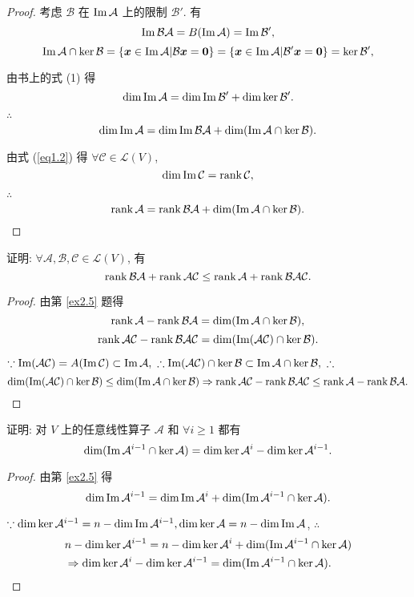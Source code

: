 \documentclass[color=black,device=normal,lang=cn,mode=geye]{elegantnote}
\begin{document}
\begin{proof}
    考虑 $\mathcal{B}$ 在 $\operatorname{Im} \mathcal{A}$ 上的限制 $\mathcal{B}'$. 有
    \[\operatorname{Im} \mathcal{BA}=B(\operatorname{Im} \mathcal{A})=\operatorname{Im} \mathcal{B}',\]
    \[\operatorname{Im} \mathcal{A}\cap\ker\mathcal{B}=\{\boldsymbol{x}\in\operatorname{Im} \mathcal{A}|\mathcal{B}\boldsymbol{x}=\boldsymbol{0}\}=\{\boldsymbol{x}\in\operatorname{Im} \mathcal{A}|\mathcal{B}'\boldsymbol{x}=\boldsymbol{0}\}=\ker\mathcal{B}',\]

    由书上的式 (1) 得
    \[\dim\operatorname{Im} \mathcal{A}=\dim\operatorname{Im} \mathcal{B}'+\dim\ker\mathcal{B}'.\]

    $\therefore$
    \[\dim\operatorname{Im} \mathcal{A}=\dim\operatorname{Im} \mathcal{BA}+\dim(\operatorname{Im} \mathcal{A}\cap\ker\mathcal{B}).\]

    由式 (\ref{eq1.2}) 得 $\forall\mathcal{C}\in\mathcal{L}(V)$,
    \[\dim\operatorname{Im} \mathcal{C}=\operatorname{rank} \mathcal{C},\]

    $\therefore$
    \[\operatorname{rank} \mathcal{A}=\operatorname{rank} \mathcal{BA}+\dim(\operatorname{Im} \mathcal{A}\cap\ker\mathcal{B}).\qedhere\]
\end{proof}
\begin{exercise}%
    证明: $\forall\mathcal{A},\mathcal{B},\mathcal{C}\in\mathcal{L}(V)$, 有
    \[\operatorname{rank} \mathcal{BA}+\operatorname{rank} \mathcal{AC}\leq\operatorname{rank} \mathcal{A}+\operatorname{rank} \mathcal{BAC}.\]
\end{exercise}
\begin{proof}
    由第 \ref{ex2.5} 题得
    \[\operatorname{rank} \mathcal{A}-\operatorname{rank} \mathcal{BA}=\dim(\operatorname{Im} \mathcal{A}\cap\ker\mathcal{B}),\]
    \[\operatorname{rank} \mathcal{AC}-\operatorname{rank} \mathcal{BAC}=\dim(\operatorname{Im} (\mathcal{AC})\cap\ker\mathcal{B}).\]

    $\because\operatorname{Im} (\mathcal{AC})=A(\operatorname{Im} \mathcal{C})\subset\operatorname{Im} \mathcal{A},\ \therefore\operatorname{Im} (\mathcal{AC})\cap\ker\mathcal{B}\subset\operatorname{Im} \mathcal{A}\cap\ker\mathcal{B},\ \therefore$
    \[\dim(\operatorname{Im} (\mathcal{AC})\cap\ker\mathcal{B})\leq\dim(\operatorname{Im} \mathcal{A}\cap\ker\mathcal{B})\Rightarrow\operatorname{rank} \mathcal{AC}-\operatorname{rank} \mathcal{BAC}\leq\operatorname{rank} \mathcal{A}-\operatorname{rank} \mathcal{BA}.\qedhere\]
\end{proof}
\begin{exercise}%
    证明: 对 $V$ 上的任意线性算子 $\mathcal{A}$ 和 $\forall i\geq1$ 都有
    \[\dim(\operatorname{Im}\mathcal{A}^{i-1}\cap\ker\mathcal{A})=\dim\ker\mathcal{A}^i-\dim\ker\mathcal{A}^{i-1}.\]
\end{exercise}
\begin{proof}
    由第 \ref{ex2.5} 得
    \[\dim\operatorname{Im}\mathcal{A}^{i-1}=\dim\operatorname{Im}\mathcal{A}^i+\dim(\operatorname{Im}\mathcal{A}^{i-1}\cap\ker\mathcal{A}).\]

    $\because\dim\ker\mathcal{A}^{i-1}=n-\dim\operatorname{Im}\mathcal{A}^{i-1},\dim\ker\mathcal{A}=n-\dim\operatorname{Im}\mathcal{A}$, $\therefore$
    \begin{align*}
        & n-\dim\ker\mathcal{A}^{i-1}=n-\dim\ker\mathcal{A}^i+\dim(\operatorname{Im}\mathcal{A}^{i-1}\cap\ker\mathcal{A}) \\
        & \Rightarrow\dim\ker\mathcal{A}^i-\dim\ker\mathcal{A}^{i-1}=\dim(\operatorname{Im}\mathcal{A}^{i-1}\cap\ker\mathcal{A}).\qedhere
    \end{align*}
\end{proof}
\end{document}
